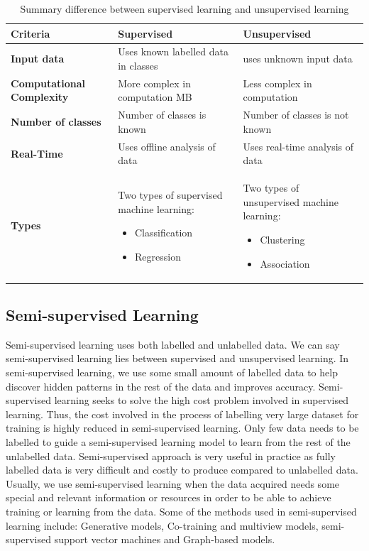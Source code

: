 \documentclass[master]{thesis-uestc}
\begin{document}
\begin{center}
\begin{table}
\caption{Summary difference between supervised learning and unsupervised learning}
\begin{tabular}{ | m{10em} | m{5cm}| m{5cm} | } 
\hline
\textbf{Criteria} & \textbf{Supervised} & \textbf{Unsupervised} \\ 
\hline
\textbf{Input data} & Uses known labelled data in classes & uses unknown input data  \\ 
\hline
\textbf{Computational Complexity} & More complex in computation MB & Less complex in computation \\ 
\hline
\textbf{Number of classes} & Number of classes is known & Number of classes is not known \\
\hline
\textbf{Real-Time} & Uses offline analysis of data & Uses real-time analysis of data \\
\hline
\textbf{Types} & Two types of supervised machine learning:
\begin{itemize}
    \item Classification
    \item Regression
\end{itemize}& Two types of unsupervised machine learning:
\begin{itemize}
    \item Clustering
    \item Association
\end{itemize}\\
\hline
\end{tabular}
\label{diff_supervised_unsupervised}
\end{table}
\end{center}

\subsection{Semi-supervised Learning}
Semi-supervised learning uses both labelled and unlabelled data. We can say semi-supervised learning lies between supervised and unsupervised learning. In semi-supervised learning, we use some small amount of labelled data to help discover hidden patterns in the rest of the data and improves accuracy. Semi-supervised learning seeks to solve the high cost problem involved in supervised learning. Thus, the cost involved in the process of labelling very large dataset for training is highly reduced in semi-supervised learning. Only few data needs to be labelled to guide a semi-supervised learning model to learn from the rest of the unlabelled data. Semi-supervised approach is very useful in practice as fully labelled data is very difficult and costly to produce compared to unlabelled data. Usually, we use semi-supervised learning when the data acquired needs some special and relevant information or resources in order to be able to achieve training or learning from the data. Some of the methods used in semi-supervised learning include: Generative models, Co-training and multiview models, semi-supervised support vector machines and Graph-based models.
\end{document}
